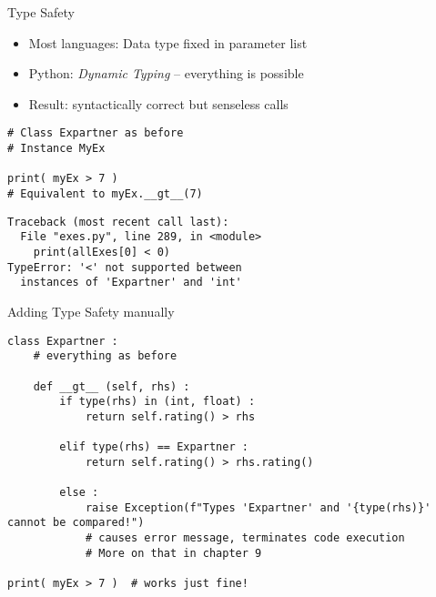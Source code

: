 \begin{frame}[fragile]{Type Safety}
%
\begin{itemize}
\item Most languages: Data type fixed in parameter list
\item Python: \emph{Dynamic Typing} -- everything is possible
\item Result: syntactically correct but senseless calls
\end{itemize}
%
\begin{tcbraster}[raster columns=2,
                  raster equal height,
                  nobeforeafter,
                  raster column skip=0.5cm]
\begin{codebox}
\begin{verbatim}
# Class Expartner as before
# Instance MyEx

print( myEx > 7 )
# Equivalent to myEx.__gt__(7)
\end{verbatim}
\end{codebox}
%
\begin{cmdbox}
\begin{verbatim}
Traceback (most recent call last):
  File "exes.py", line 289, in <module>
    print(allExes[0] < 0)
TypeError: '<' not supported between
  instances of 'Expartner' and 'int'
\end{verbatim}
\end{cmdbox}
\end{tcbraster}
%
\end{frame}


\begin{frame}[fragile]{Adding Type Safety manually}
%
\begin{codebox}
\begin{verbatim}
class Expartner :
    # everything as before
    
    def __gt__ (self, rhs) :
        if type(rhs) in (int, float) :
            return self.rating() > rhs
            
        elif type(rhs) == Expartner :
            return self.rating() > rhs.rating()
            
        else :
            raise Exception(f"Types 'Expartner' and '{type(rhs)}' cannot be compared!")
            # causes error message, terminates code execution
            # More on that in chapter 9

print( myEx > 7 )  # works just fine!
\end{verbatim}
\end{codebox}
%
\end{frame}

